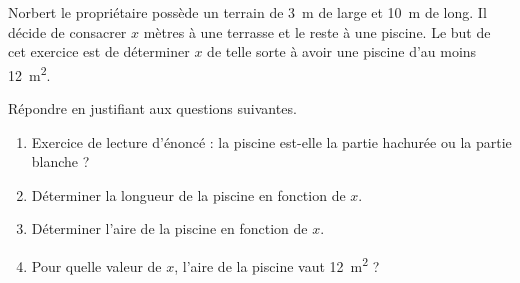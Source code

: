 
\begin{exercice}\label{exosmath-0981}

    Norbert le propriétaire possède un terrain de \SI{3}{\meter} de large et \SI{10}{\meter} de long. Il décide de consacrer \( x\) mètres à une terrasse et le reste à une piscine. Le but de cet exercice est de déterminer \( x\) de telle sorte à avoir une piscine d'au moins \SI{12}{\meter\squared}.

\begin{center}
   
\end{center}

Répondre en justifiant aux questions suivantes.
\begin{enumerate}
    \item
        Exercice de lecture d'énoncé : la piscine est-elle la partie hachurée ou la partie blanche ?
    \item
        Déterminer la longueur de la piscine en fonction de \( x\).
    \item
        Déterminer l'aire de la piscine en fonction de \( x\).
    \item
        Pour quelle valeur de \( x\), l'aire de la piscine vaut \SI{12}{\meter\squared} ?
\end{enumerate}


\end{exercice}

